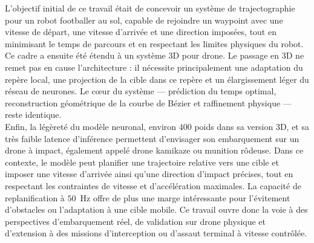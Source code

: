 \documentclass[12pt]{report}
\theoremstyle{plain}
\begin{document}
L’objectif initial de ce travail était de concevoir un système de trajectographie pour un robot footballer au sol, capable de rejoindre un waypoint avec une vitesse de départ, une vitesse d’arrivée et une direction imposées, tout en minimisant le temps de parcours et en respectant les limites physiques du robot. Ce cadre a ensuite été étendu à un système 3D pour drone. Le passage en 3D ne remet pas en cause l’architecture : il nécessite principalement une adaptation du repère local, une projection de la cible dans ce repère et un élargissement léger du réseau de neurones. Le cœur du système — prédiction du temps optimal, reconstruction géométrique de la courbe de Bézier et raffinement physique — reste identique.\\

Enfin, la légèreté du modèle neuronal, environ \(400\) poids dans sa version 3D, et sa très faible latence d’inférence permettent d’envisager son embarquement sur un drone à impact, également appelé drone kamikaze ou munition rôdeuse. Dans ce contexte, le modèle peut planifier une trajectoire relative vers une cible et imposer une vitesse d’arrivée ainsi qu’une direction d’impact précises, tout en respectant les contraintes de vitesse et d’accélération maximales. La capacité de replanification à \(50\)~Hz offre de plus une marge intéressante pour l’évitement d’obstacles ou l’adaptation à une cible mobile. Ce travail ouvre donc la voie à des perspectives d’embarquement réel, de validation sur drone physique et d’extension à des missions d’interception ou d’assaut terminal à vitesse contrôlée.
\end{document}
